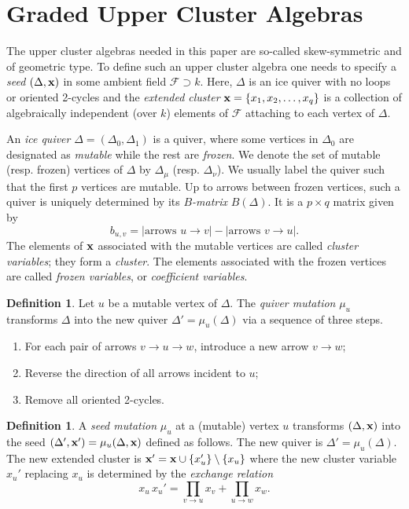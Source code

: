 \documentclass{amsart}
\theoremstyle{definition}
\newtheorem{definition}[theorem]{Definition}
\theoremstyle{remark}
\numberwithin{equation}{section}
\newcommand{\mc}[1]{\mathcal{#1}}
\renewcommand{\b}[1]{\bold{#1}}
\begin{document}
\section{Graded Upper Cluster Algebras} \label{S:UCA}
The upper cluster algebras needed in this paper are so-called skew-symmetric and of geometric type. 
To define such an upper cluster algebra one needs to specify a {\em seed} $(\Delta,\b{x})$ in some ambient field $\mc{F}\supset k$.
Here, $\Delta$ is an ice quiver with no loops or oriented 2-cycles and 
the {\em extended cluster} $\b{x}=\{x_1,x_2,\dots,x_q\}$ is a collection of algebraically independent (over $k$)
elements of $\mc{F}$ attaching to each vertex of $\Delta$.

An {\em ice quiver} $\Delta=(\Delta_0,\Delta_1)$ is a quiver, where some vertices in $\Delta_0$ are designated as {\em mutable} while the rest are {\em frozen}.
We denote the set of mutable (resp. frozen) vertices of $\Delta$ by $\Delta_\mu$ (resp. $\Delta_\nu$).
We usually label the quiver such that the first $p$ vertices are mutable.
Up to arrows between frozen vertices, such a quiver is uniquely determined by its {\em $B$-matrix} $B(\Delta)$.
It is a $p\times q$ matrix given by
$$b_{u,v} = |\text{arrows }u\to v| - |\text{arrows }v \to u|.$$
The elements of $\b{x}$ associated with the mutable vertices are called {\em cluster variables}; they form a {\em cluster}.
The elements associated with the frozen vertices are called {\em frozen variables}, or {\em coefficient variables}.

\begin{definition} \label{D:Qmu}%
	Let $u$ be a mutable vertex of $\Delta$.
	The {\em quiver mutation} $\mu_u$ transforms $\Delta$ into the new quiver $\Delta'=\mu_u(\Delta)$ via a sequence of three steps.
	\begin{enumerate}
		\item For each pair of arrows $v\to u\to w$, introduce a new arrow $v\to w$; %
		\item Reverse the direction of all arrows incident to $u$;
		\item Remove all oriented 2-cycles.
	\end{enumerate}
\end{definition}

\begin{definition} 
	A {\em seed mutation} $\mu_u$ at a (mutable) vertex $u$ transforms $(\Delta,\b{x})$ into the seed $(\Delta',\b{x}')=\mu_u(\Delta,\b{x})$ defined as follows.
	The new quiver is $\Delta'=\mu_u(\Delta)$.
	The new extended cluster is
	$\b{x}'=\b{x}\cup\{x_{u}'\}\setminus\{x_u\}$
	where the new cluster variable $x_u'$ replacing $x_u$ is determined by the {\em exchange relation}
	\begin{equation*} \label{eq:exrel}
	x_u\,x_u' = \prod_{v\rightarrow u} x_v + \prod_{u\rightarrow w} x_w.
	\end{equation*}
\end{definition}
\end{document}
